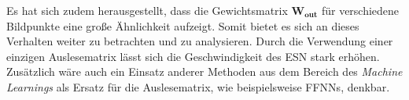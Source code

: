 Es hat sich zudem herausgestellt, dass die Gewichtsmatrix $\mathbf{W_{out}}$ für verschiedene Bildpunkte eine große Ähnlichkeit aufzeigt. Somit bietet es sich an dieses Verhalten weiter zu betrachten und zu analysieren. Durch die Verwendung einer einzigen Auslesematrix lässt sich die Geschwindigkeit des \textsc{ESN} stark erhöhen. Zusätzlich wäre auch ein Einsatz anderer Methoden aus dem Bereich des \textit{Machine Learnings} als Ersatz für die Auslesematrix, wie beispielsweise \textsc{FFNN}s, denkbar.  